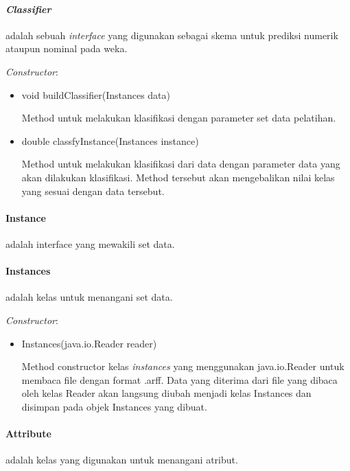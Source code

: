 \paragraph{\textsl{Classifier}} adalah sebuah \textsl{interface} yang digunakan sebagai skema untuk prediksi numerik ataupun nominal pada weka. 

\textsl{Constructor}:
\begin{itemize}
	
	\item void buildClassifier(Instances data)
	
	Method untuk melakukan klasifikasi dengan parameter set data pelatihan.
	
	\item double classfyInstance(Instances instance)
	
	Method untuk melakukan klasifikasi dari data dengan parameter data yang akan dilakukan klasifikasi. Method tersebut akan mengebalikan nilai kelas yang sesuai dengan data tersebut.
	
\end{itemize}

\paragraph{Instance} adalah interface yang mewakili set data.

\paragraph{Instances} adalah kelas untuk menangani set data.

\textsl{Constructor}:
\begin{itemize}
	\item Instances(java.io.Reader reader)
	
	Method constructor kelas \textsl{instances} yang menggunakan java.io.Reader untuk membaca file dengan format .arff. Data yang diterima dari file yang dibaca oleh kelas Reader akan langsung diubah menjadi kelas Instances dan disimpan pada objek Instances yang dibuat.
\end{itemize}

\paragraph{Attribute} adalah kelas yang digunakan untuk menangani atribut.

